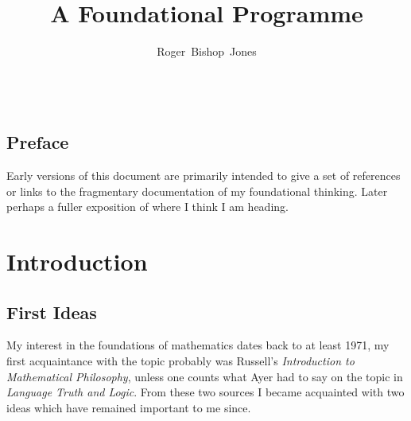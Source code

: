 \documentclass[10pt,titlepage]{book}
\title{A Foundational Programme}
\author{Roger~Bishop~Jones}
\date{\ }
\newcommand{\ignore}[1]{}
\begin{document}
\frontmatter
                               
\begin{titlepage}
\maketitle

\ignore{
\vfill


\begin{centering}

{\footnotesize

\copyright\ Roger~Bishop~Jones;
}%

\end{centering}
}%

\end{titlepage}

\setcounter{tocdepth}{2}
{\parskip-0pt\tableofcontents}


\mainmatter


\section*{Preface}

Early versions of this document are primarily intended to give a set of references or links to the fragmentary documentation of my foundational thinking.
Later perhaps a fuller exposition of where I think I am heading.

\chapter{Introduction}

\section{First Ideas}

My interest in the foundations of mathematics dates back to at least 1971, my first acquaintance with the topic probably was Russell's \emph{Introduction to Mathematical Philosophy}\cite{russell1919}, unless one counts what Ayer had to say on the topic in \emph{Language Truth and Logic}\cite{ayer1936}.
From these two sources I became acquainted with two ideas which have remained important to me since.
\end{document}

